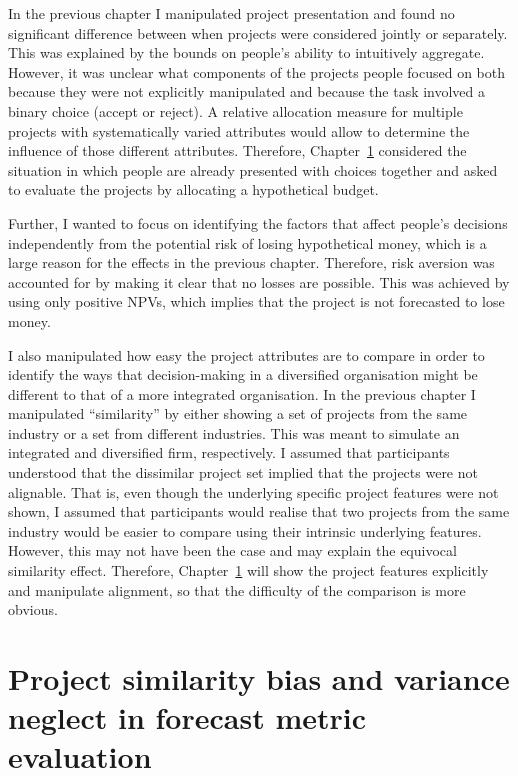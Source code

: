 \documentclass[a4paper, nobind, dvipsnames]{templates/ociamthesis}
\theoremstyle{definition}
\theoremstyle{definition}
\theoremstyle{definition}
\theoremstyle{definition}
\theoremstyle{remark}
\begin{document}
In the previous chapter I manipulated project presentation and found no
significant difference between when projects were considered jointly or
separately. This was explained by the bounds on people's ability to intuitively
aggregate. However, it was unclear what components of the projects people
focused on both because they were not explicitly manipulated and because the
task involved a binary choice (accept or reject). A relative allocation measure
for multiple projects with systematically varied attributes would allow to
determine the influence of those different attributes. Therefore,
Chapter~\ref{alignment} considered the situation in which people are already
presented with choices together and asked to evaluate the projects by allocating
a hypothetical budget.

Further, I wanted to focus on identifying the factors that affect people's
decisions independently from the potential risk of losing hypothetical money,
which is a large reason for the effects in the previous chapter. Therefore, risk
aversion was accounted for by making it clear that no losses are possible. This
was achieved by using only positive NPVs, which implies that the project is not
forecasted to lose money.

I also manipulated how easy the project attributes are to compare in order to
identify the ways that decision-making in a diversified organisation might be
different to that of a more integrated organisation. In the previous chapter I
manipulated ``similarity'' by either showing a set of projects from the same
industry or a set from different industries. This was meant to simulate an
integrated and diversified firm, respectively. I assumed that participants
understood that the dissimilar project set implied that the projects were not
alignable. That is, even though the underlying specific project features were
not shown, I assumed that participants would realise that two projects from the
same industry would be easier to compare using their intrinsic underlying
features. However, this may not have been the case and may explain the equivocal
similarity effect. Therefore, Chapter~\ref{alignment} will show the project
features explicitly and manipulate alignment, so that the difficulty of the
comparison is more obvious.

\hypertarget{alignment}{%
\chapter{Project similarity bias and variance neglect in forecast metric evaluation}\label{alignment}}
\end{document}
